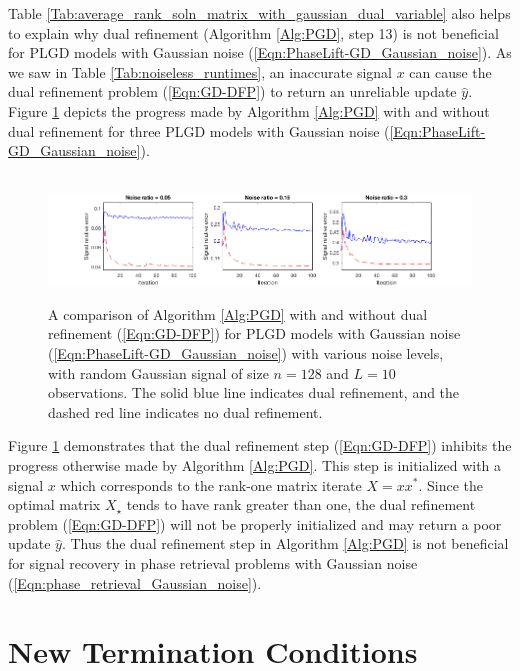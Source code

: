 Table \ref{Tab:average_rank_soln_matrix_with_gaussian_dual_variable} also helps to explain why dual refinement (Algorithm \ref{Alg:PGD}, step 13) is not beneficial for PLGD models with Gaussian noise (\ref{Eqn:PhaseLift-GD_Gaussian_noise}).  As we saw in Table \ref{Tab:noiseless_runtimes}, an inaccurate signal $x$ can cause the dual refinement problem (\ref{Eqn:GD-DFP}) to return an unreliable update $\hat{y}$.  Figure \ref{Fig:noisy_random_DFP_vs_no_DFP} depicts the progress made by Algorithm \ref{Alg:PGD} with and without dual refinement for three PLGD models with Gaussian noise (\ref{Eqn:PhaseLift-GD_Gaussian_noise}).

\begin{figure}[H]
\hbox{\hspace{-1.0cm}  \includegraphics[scale=0.6]{noisy_random_signal_DFP_vs_no_DFP}}
\caption{A comparison of Algorithm \ref{Alg:PGD} with and without dual refinement (\ref{Eqn:GD-DFP}) for PLGD models with Gaussian noise (\ref{Eqn:PhaseLift-GD_Gaussian_noise}) with various noise levels, with random Gaussian signal of size $n = 128$ and $L = 10$ observations.  The solid blue line indicates dual refinement, and the dashed red line indicates no dual refinement.}
\label{Fig:noisy_random_DFP_vs_no_DFP}
\end{figure}



Figure \ref{Fig:noisy_random_DFP_vs_no_DFP} demonstrates that the dual refinement step (\ref{Eqn:GD-DFP})  inhibits the progress otherwise made by Algorithm \ref{Alg:PGD}.  This step is initialized with a signal $x$ which corresponds to the rank-one matrix iterate $X = xx^*$.  Since the optimal matrix $X_\star$ tends to have rank greater than one, the dual refinement problem (\ref{Eqn:GD-DFP}) will not be properly initialized and may return a poor update $\hat{y}$.  Thus the dual refinement step in Algorithm \ref{Alg:PGD} is not beneficial for signal recovery in phase retrieval problems with Gaussian noise (\ref{Eqn:phase_retrieval_Gaussian_noise}).





\section{New Termination Conditions}  	\label{Subsec:PLGD_term_crit-new_term_crit}


